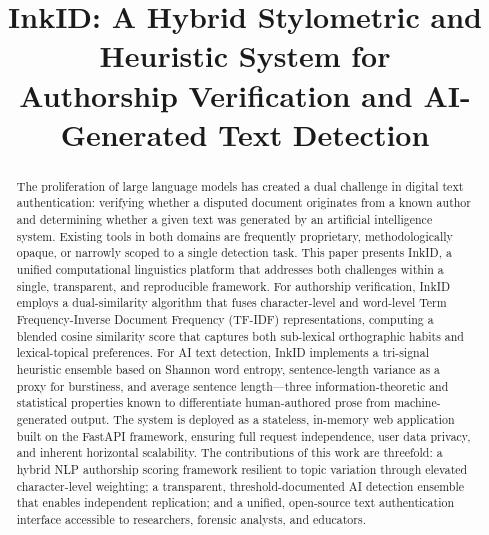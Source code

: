 \documentclass[conference]{IEEEtran}
\begin{document}
\title{InkID: A Hybrid Stylometric and Heuristic System for\\
Authorship Verification and AI-Generated Text Detection}

\author{
}

\maketitle

\begin{abstract}
The proliferation of large language models has created a dual challenge in
digital text authentication: verifying whether a disputed document originates
from a known author and determining whether a given text was generated by an
artificial intelligence system. Existing tools in both domains are frequently
proprietary, methodologically opaque, or narrowly scoped to a single detection
task. This paper presents InkID, a unified computational linguistics platform
that addresses both challenges within a single, transparent, and reproducible
framework. For authorship verification, InkID employs a dual-similarity
algorithm that fuses character-level and word-level Term Frequency-Inverse
Document Frequency (TF-IDF) representations, computing a blended cosine
similarity score that captures both sub-lexical orthographic habits and
lexical-topical preferences. For AI text detection, InkID implements a
tri-signal heuristic ensemble based on Shannon word entropy, sentence-length
variance as a proxy for burstiness, and average sentence length—three
information-theoretic and statistical properties known to differentiate
human-authored prose from machine-generated output. The system is deployed as
a stateless, in-memory web application built on the FastAPI framework, ensuring
full request independence, user data privacy, and inherent horizontal
scalability. The contributions of this work are threefold: a hybrid NLP
authorship scoring framework resilient to topic variation through elevated
character-level weighting; a transparent, threshold-documented AI detection
ensemble that enables independent replication; and a unified, open-source text
authentication interface accessible to researchers, forensic analysts, and
educators.
\end{abstract}
\end{document}
